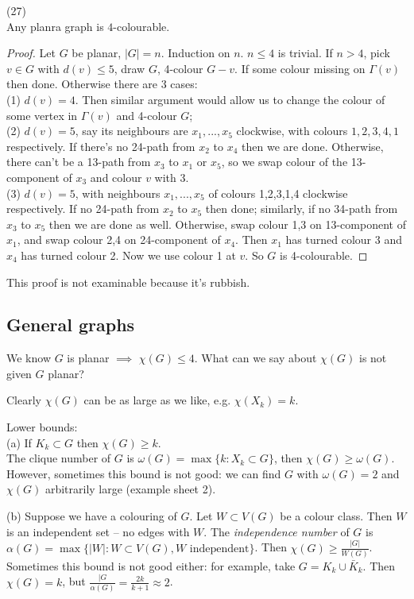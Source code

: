 \documentclass[a4paper]{article}
\begin{document}
\begin{thm} (27)\\
Any planra graph is $4$-colourable.
\begin{proof}
Let $G$ be planar, $|G| = n$. Induction on $n$. $n\leq 4$ is trivial. If $n>4$, pick $v \in G$ with $d(v) \leq 5$, draw $G$, 4-colour $G-v$. If some colour missing on $\Gamma(v)$ then done. Otherwise there are 3 cases:\\
(1) $d(v) = 4$. Then similar argument would allow us to change the colour of some vertex in $\Gamma(v)$ and 4-colour $G$;\\
(2) $d(v) = 5$, say its neighbours are $x_1,...,x_5$ clockwise, with colours $1,2,3,4,1$ respectively. If there's no 24-path from $x_2$ to $x_4$ then we are done. Otherwise, there can't be a 13-path from $x_3$ to $x_1$ or $x_5$, so we swap colour of the 13-component of $x_3$ and colour $v$ with 3.\\
(3) $d(v) = 5$, with neighbours $x_1,...,x_5$ of colours 1,2,3,1,4 clockwise respectively. If no 24-path from $x_2$ to $x_5$ then done; similarly, if no 34-path from $x_3$ to $x_5$ then we are done as well. Otherwise, swap colour 1,3 on 13-component of $x_1$, and swap colour 2,4 on 24-component of $x_4$. Then $x_1$ has turned colour 3 and $x_4$ has turned colour 2. Now we use colour 1 at $v$. So $G$ is 4-colourable.
\end{proof}
\end{thm}

\begin{rem}
This proof is not examinable because it's rubbish. 
\end{rem}

\subsection{General graphs}
We know $G$ is planar $\implies$ $\chi(G) \leq 4$. What can we say about $\chi(G)$ is not given $G$ planar?

Clearly $\chi(G)$ can be as large as we like, e.g. $\chi(X_k) = k$.

Lower bounds:\\
(a) If $K_k \subset G$ then $\chi(G) \geq k$.\\
The clique number of $G$ is $\omega(G) = \max\{k:X_k \subset G\}$, then $\chi(G) \geq \omega(G)$. However, sometimes this bound is not good: we can find $G$ with $\omega(G) = 2$ and $\chi(G)$ arbitrarily large (example sheet 2).

(b) Suppose we have a colouring of $G$. Let $W \subset V(G)$ be a colour class. Then $W$ is an independent set -- no edges with $W$. The \emph{independence number} of $G$ is $\alpha(G) = \max \{|W|:W \subset V(G), W \text{ independent} \}$. Then $\chi(G) \geq \frac{|G|}{W(G)}$. Sometimes this bound is not good either: for example, take $G = K_k \cup \bar{K}_k$. Then $\chi(G) = k$, but $\frac{|G}{\alpha(G)} = \frac{2k}{k+1} \approx 2$.
\end{document}
